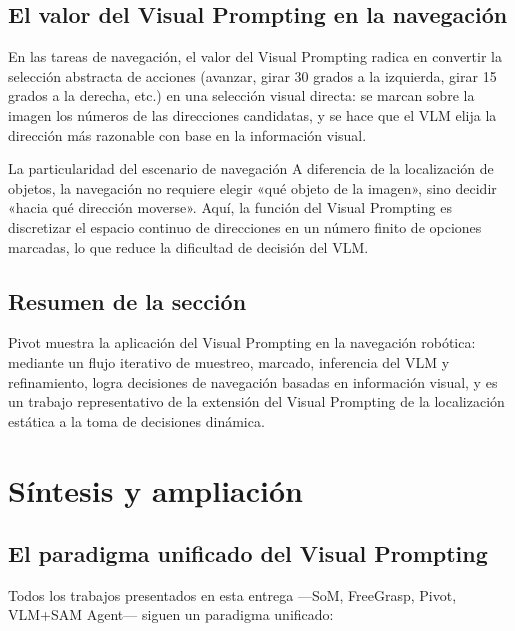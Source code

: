 \documentclass[a4paper]{article}
\begin{document}
\subsection{El valor del Visual Prompting en la navegación}

En las tareas de navegación, el valor del Visual Prompting radica en convertir la selección abstracta de acciones (avanzar, girar 30 grados a la izquierda, girar 15 grados a la derecha, etc.) en una selección visual directa: se marcan sobre la imagen los números de las direcciones candidatas, y se hace que el VLM elija la dirección más razonable con base en la información visual.

\begin{warningbox}{La particularidad del escenario de navegación}
A diferencia de la localización de objetos, la navegación no requiere elegir «qué objeto de la imagen», sino decidir «hacia qué dirección moverse». Aquí, la función del Visual Prompting es discretizar el espacio continuo de direcciones en un número finito de opciones marcadas, lo que reduce la dificultad de decisión del VLM.
\end{warningbox}

\subsection{Resumen de la sección}

Pivot muestra la aplicación del Visual Prompting en la navegación robótica: mediante un flujo iterativo de muestreo, marcado, inferencia del VLM y refinamiento, logra decisiones de navegación basadas en información visual, y es un trabajo representativo de la extensión del Visual Prompting de la localización estática a la toma de decisiones dinámica.

\section{Síntesis y ampliación}

\subsection{El paradigma unificado del Visual Prompting}

Todos los trabajos presentados en esta entrega —SoM, FreeGrasp, Pivot, VLM+SAM Agent— siguen un paradigma unificado:
\end{document}
